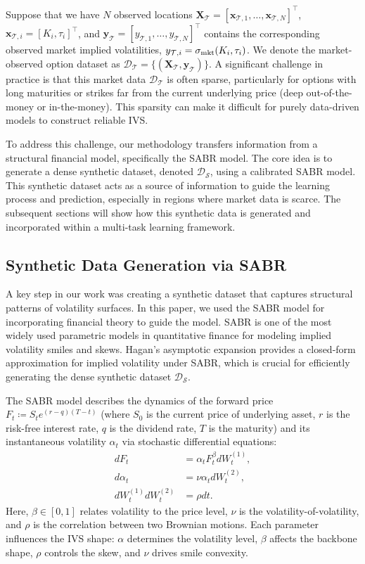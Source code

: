 \documentclass[preprint,12pt]{elsarticle}
\begin{document}
Suppose that we have $N$ observed locations $\mathbf{X}_{\mathcal{T}}=[\mathbf{x}_{\mathcal{T},1},\dots,\mathbf{x}_{\mathcal{T},N}]^\intercal$, $\mathbf{x}_{\mathcal{T},i}=[K_i, \tau_i]^\intercal$, and $\mathbf{y}_\mathcal{T}=[y_{\mathcal{T},1},\dots,y_{\mathcal{T},N}]^\intercal$ contains the corresponding observed market implied volatilities, $y_{\mathcal{T},i} = \sigma_{\rm mkt}(K_{i},\tau_i)$. We denote the market-observed option dataset as $\mathcal{D}_\mathcal{T} = \{(\mathbf{X}_\mathcal{T}, \mathbf{y}_\mathcal{T})\}$. A significant challenge in practice is that this market data $\mathcal{D}_\mathcal{T}$ is often sparse, particularly for options with long maturities or strikes far from the current underlying price (deep out-of-the-money or in-the-money). This sparsity can make it difficult for purely data-driven models to construct reliable IVS.

To address this challenge, our methodology transfers information from a structural financial model, specifically the SABR model. The core idea is to generate a dense synthetic dataset, denoted $\mathcal{D}_\mathcal{S}$, using a calibrated SABR model. This synthetic dataset acts as a source of information to guide the learning process and prediction, especially in regions where market data is scarce. The subsequent sections will show how this synthetic data is generated and incorporated within a multi-task learning framework.

\subsection{Synthetic Data Generation via SABR}

A key step in our work was creating a synthetic dataset that captures structural patterns of volatility surfaces. In this paper, we used the SABR model \citep{Hagan2002} for incorporating financial theory to guide the model. SABR is one of the most widely used parametric models in quantitative finance for modeling implied volatility smiles and skews. Hagan's asymptotic expansion provides a closed-form approximation for implied volatility under SABR, which is crucial for efficiently generating the dense synthetic dataset $\mathcal{D}_\mathcal{S}$.

The SABR model describes the dynamics of the forward price $F_t\coloneqq S_te^{(r-q)(T-t)}$ (where $S_0$ is the current price of underlying asset, $r$ is the risk-free interest rate, $q$ is the dividend rate, $T$ is the maturity) and its instantaneous volatility $\alpha_t$ via stochastic differential equations:
\begin{align}
dF_t &= \alpha_t F_t^\beta dW_t^{(1)}, \\
d\alpha_t &= \nu \alpha_t dW_t^{(2)}, \\
dW_t^{(1)} dW_t^{(2)} &= \rho dt.
\end{align}
Here, $\beta \in [0,1]$ relates volatility to the price level, $\nu$ is the volatility-of-volatility, and $\rho$ is the correlation between two Brownian motions. Each parameter influences the IVS shape: $\alpha$ determines the volatility level, $\beta$ affects the backbone shape, $\rho$ controls the skew, and $\nu$ drives smile convexity.
\end{document}
